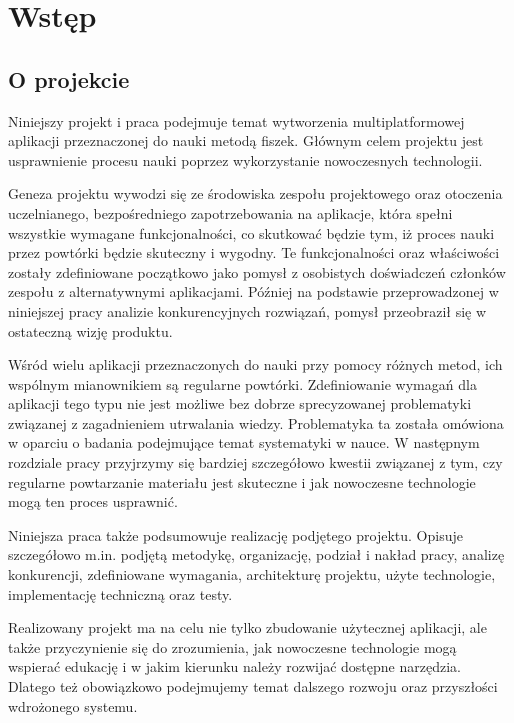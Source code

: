 \chapter{Wstęp}

\section{O projekcie}\label{ch:wstep}

Niniejszy projekt i praca podejmuje temat wytworzenia multiplatformowej aplikacji przeznaczonej do nauki metodą fiszek. Głównym celem projektu jest usprawnienie procesu nauki poprzez wykorzystanie nowoczesnych technologii.

Geneza projektu wywodzi się ze środowiska zespołu projektowego oraz otoczenia uczelnianego, bezpośredniego zapotrzebowania na aplikacje, która spełni wszystkie wymagane funkcjonalności, co skutkować będzie tym, iż proces nauki przez powtórki będzie skuteczny i wygodny. Te funkcjonalności oraz właściwości zostały zdefiniowane początkowo jako pomysł z osobistych doświadczeń członków zespołu z alternatywnymi aplikacjami. Później na podstawie przeprowadzonej w niniejszej pracy analizie konkurencyjnych rozwiązań, pomysł przeobraził się w ostateczną wizję produktu.

Wśród wielu aplikacji przeznaczonych do nauki przy pomocy różnych metod, ich wspólnym mianownikiem są regularne powtórki. Zdefiniowanie wymagań dla aplikacji tego typu nie jest możliwe bez dobrze sprecyzowanej problematyki związanej z zagadnieniem utrwalania wiedzy. Problematyka ta została omówiona w oparciu o badania podejmujące temat systematyki w nauce. W następnym rozdziale pracy przyjrzymy się bardziej szczegółowo kwestii związanej z tym, czy regularne powtarzanie materiału jest skuteczne i jak nowoczesne technologie mogą ten proces usprawnić.

Niniejsza praca także podsumowuje realizację podjętego projektu. Opisuje szczegółowo m.in. podjętą metodykę, organizację, podział i nakład pracy, analizę konkurencji, zdefiniowane wymagania, architekturę projektu, użyte technologie, implementację techniczną oraz testy.

Realizowany projekt ma na celu nie tylko zbudowanie użytecznej aplikacji, ale także przyczynienie się do zrozumienia, jak nowoczesne technologie mogą wspierać edukację i w jakim kierunku należy rozwijać dostępne narzędzia. Dlatego też obowiązkowo podejmujemy temat dalszego rozwoju oraz przyszłości wdrożonego systemu.

